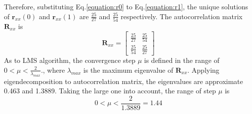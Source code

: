 Therefore, substituting Eq.\ref{equation:r0} to Eq.\ref{equation:r1}, the unique solutions of $\mathbf{r}_{xx}(0)$ and $\mathbf{r}_{xx}(1)$ are $\frac{25}{27}$ and $\frac{25}{54}$ respectively. The autocorrelation matrix $\mathbf{R}_{xx}$ is
\begin{equation}
\mathbf{R}_{xx}=\left[
\begin{matrix}
\frac{25}{27}&\frac{25}{54}\\
\frac{25}{54}&\frac{25}{27}
\end{matrix}\right]
\end{equation} 
As to LMS algorithm, the convergence step $\mu$ is defined in the range of $0<\mu<\frac{2}{\lambda_{max}}$., where $\lambda_{max}$ is the maximum eigenvalue of $\mathbf{R}_{xx}$. Applying eigendecomposition to autocorrelation matrix, the eigenvalues are approximate 0.463 and 1.3889. Taking the large one into account, the range of step $\mu$ is
\begin{equation}
0<\mu<\frac{2}{1.3889}=1.44
\label{eq:range}
\end{equation}
